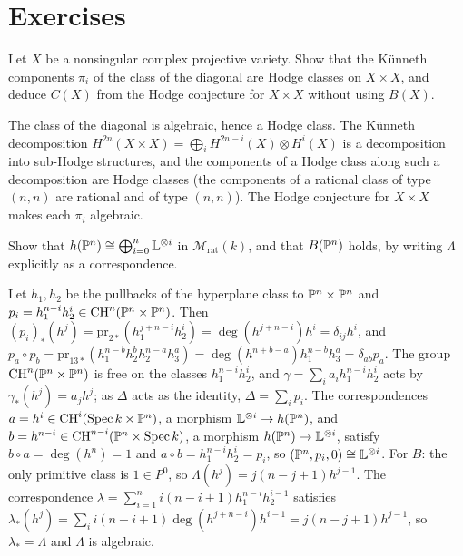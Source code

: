 \section{Exercises}\label{standard-conjectures:section-exercises}

\begin{exercise}\label{standard-conjectures:exercise-kunneth-hodge}
Let $X$ be a nonsingular complex projective variety. Show that the K\"unneth components $\pi_i$ of the class of the diagonal are Hodge classes on $X \times X$, and deduce $C(X)$ from the Hodge conjecture
for $X \times X$ without using $B(X)$.
\end{exercise}

\begin{solution}
The class of the diagonal is algebraic, hence a Hodge class. The K\"unneth decomposition $H^{2n}(X \times X) = \bigoplus_iH^{2n-i}(X) \otimes H^i(X)$ is a decomposition into sub-Hodge structures, and the components
of a Hodge class along such a decomposition are Hodge classes (the components of a rational class of type $(n,n)$ are rational and of type $(n,n)$). The Hodge conjecture for $X \times X$ makes each $\pi_i$
algebraic.
\end{solution}

\begin{exercise}\label{standard-conjectures:exercise-projective-space}
Show that $h(\mathbb{P}^n) \cong \bigoplus_{i=0}^n\mathbb{L}^{\otimes i}$ in $\mathcal{M}_{\mathrm{rat}}(k)$, and that $B(\mathbb{P}^n)$ holds, by writing $\Lambda$ explicitly as a correspondence.
\end{exercise}

\begin{solution}
Let $h_1, h_2$ be the pullbacks of the hyperplane class to $\mathbb{P}^n \times \mathbb{P}^n$ and $p_i = h_1^{n-i}h_2^i \in \operatorname{CH}^n(\mathbb{P}^n \times \mathbb{P}^n)$. Then $(p_i)_*(h^j) = \mathrm{pr}_{2*}(h_1^{j+n-i}h_2^i) = \deg(h^{j+n-i})h^i = \delta_{ij}h^i$, and
$p_a \circ p_b = \mathrm{pr}_{13*}(h_1^{n-b}h_2^{b}h_2^{n-a}h_3^a) = \deg(h^{n+b-a})h_1^{n-b}h_3^a = \delta_{ab}p_a$. The group $\operatorname{CH}^n(\mathbb{P}^n \times \mathbb{P}^n)$ is free on the classes $h_1^{n-i}h_2^i$, and
$\gamma = \sum_ia_ih_1^{n-i}h_2^i$ acts by $\gamma_*(h^j) = a_jh^j$; as $\Delta$ acts as the identity, $\Delta = \sum_ip_i$. The correspondences $a = h^i \in \operatorname{CH}^i(\operatorname{Spec} k \times \mathbb{P}^n)$, a morphism $\mathbb{L}^{\otimes i} \to h(\mathbb{P}^n)$,
and $b = h^{n-i} \in \operatorname{CH}^{n-i}(\mathbb{P}^n \times \operatorname{Spec} k)$, a morphism $h(\mathbb{P}^n) \to \mathbb{L}^{\otimes i}$, satisfy $b \circ a = \deg(h^n) = 1$ and $a \circ b = h_1^{n-i}h_2^i = p_i$, so $(\mathbb{P}^n, p_i, 0) \cong \mathbb{L}^{\otimes i}$. For $B$: the
only primitive class is $1 \in P^0$, so $\Lambda(h^j) = j(n - j + 1)h^{j-1}$. The correspondence $\lambda = \sum_{i=1}^ni(n - i + 1)h_1^{n-i}h_2^{i-1}$ satisfies
$\lambda_*(h^j) = \sum_ii(n - i + 1)\deg(h^{j+n-i})h^{i-1} = j(n - j + 1)h^{j-1}$, so $\lambda_* = \Lambda$ and $\Lambda$ is algebraic.
\end{solution}

